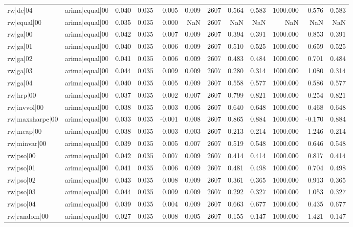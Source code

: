 \begin{table}
\begin{tabular}{llrrrrrrrrrr}
rw|de|04 & arima|equal|00 & 0.040 & 0.035 & 0.005 & 0.009 & 2607 & 0.564 & 0.583 & 1000.000 & 0.576 & 0.583 \\
rw|equal|00 & arima|equal|00 & 0.035 & 0.035 & 0.000 & NaN & 2607 & NaN & NaN & NaN & NaN & NaN \\
rw|ga|00 & arima|equal|00 & 0.042 & 0.035 & 0.007 & 0.009 & 2607 & 0.394 & 0.391 & 1000.000 & 0.853 & 0.391 \\
rw|ga|01 & arima|equal|00 & 0.040 & 0.035 & 0.006 & 0.009 & 2607 & 0.510 & 0.525 & 1000.000 & 0.659 & 0.525 \\
rw|ga|02 & arima|equal|00 & 0.041 & 0.035 & 0.006 & 0.009 & 2607 & 0.483 & 0.484 & 1000.000 & 0.701 & 0.484 \\
rw|ga|03 & arima|equal|00 & 0.044 & 0.035 & 0.009 & 0.009 & 2607 & 0.280 & 0.314 & 1000.000 & 1.080 & 0.314 \\
rw|ga|04 & arima|equal|00 & 0.040 & 0.035 & 0.005 & 0.009 & 2607 & 0.558 & 0.577 & 1000.000 & 0.586 & 0.577 \\
rw|hrp|00 & arima|equal|00 & 0.037 & 0.035 & 0.002 & 0.007 & 2607 & 0.799 & 0.821 & 1000.000 & 0.254 & 0.821 \\
rw|invvol|00 & arima|equal|00 & 0.038 & 0.035 & 0.003 & 0.006 & 2607 & 0.640 & 0.648 & 1000.000 & 0.468 & 0.648 \\
rw|maxsharpe|00 & arima|equal|00 & 0.033 & 0.035 & -0.001 & 0.008 & 2607 & 0.865 & 0.884 & 1000.000 & -0.170 & 0.884 \\
rw|mcap|00 & arima|equal|00 & 0.038 & 0.035 & 0.003 & 0.003 & 2607 & 0.213 & 0.214 & 1000.000 & 1.246 & 0.214 \\
rw|minvar|00 & arima|equal|00 & 0.039 & 0.035 & 0.005 & 0.007 & 2607 & 0.519 & 0.548 & 1000.000 & 0.646 & 0.548 \\
rw|pso|00 & arima|equal|00 & 0.042 & 0.035 & 0.007 & 0.009 & 2607 & 0.414 & 0.414 & 1000.000 & 0.817 & 0.414 \\
rw|pso|01 & arima|equal|00 & 0.041 & 0.035 & 0.006 & 0.009 & 2607 & 0.481 & 0.498 & 1000.000 & 0.704 & 0.498 \\
rw|pso|02 & arima|equal|00 & 0.043 & 0.035 & 0.008 & 0.009 & 2607 & 0.361 & 0.365 & 1000.000 & 0.913 & 0.365 \\
rw|pso|03 & arima|equal|00 & 0.044 & 0.035 & 0.009 & 0.009 & 2607 & 0.292 & 0.327 & 1000.000 & 1.053 & 0.327 \\
rw|pso|04 & arima|equal|00 & 0.039 & 0.035 & 0.004 & 0.009 & 2607 & 0.663 & 0.677 & 1000.000 & 0.435 & 0.677 \\
rw|random|00 & arima|equal|00 & 0.027 & 0.035 & -0.008 & 0.005 & 2607 & 0.155 & 0.147 & 1000.000 & -1.421 & 0.147 \\

\end{tabular}
\end{table}
